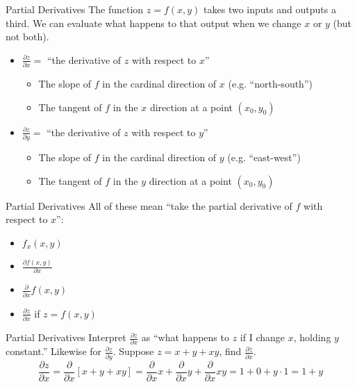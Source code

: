 \documentclass[aspectratio=169]{beamer}
\begin{document}
\begin{frame}{Partial Derivatives}\label{main1}
    The function $z = f(x, y)$ takes two inputs and outputs a third.  We can evaluate what happens to that output when we change $x$ or $y$ (but not both).
    \begin{itemize}
        \item $\frac{\partial z}{\partial x} =$ “the derivative of $z$ with respect to $x$”
        \begin{itemize}
        \item The slope of $f$ in the cardinal direction of $x$ (e.g. “north-south”)
        \item The tangent of $f$ in the $x$ direction at a point $(x_0, y_0)$
        \end{itemize}
        \item $\frac{\partial z}{\partial y} =$ “the derivative of $z$ with respect to $y$”
        \begin{itemize}
        \item The slope of $f$ in the cardinal direction of $y$ (e.g. “east-west”)
        \item The tangent of $f$ in the $y$ direction at a point $(x_0, y_0)$
    	\end{itemize}
    \end{itemize}
\end{frame}

\begin{frame}{Partial Derivatives}\label{main1}
    All of these mean “take the partial derivative of $f$ with respect to $x$”:
    \begin{itemize}
        \item $f_x(x, y)$
        \item $\frac{\partial f(x, y)}{\partial x}$
        \item $\frac{\partial}{\partial x} f(x, y)$
        \item $\frac{\partial z}{\partial x}$ if $z = f(x, y)$
    \end{itemize}
\end{frame}

\begin{frame}{Partial Derivatives}\label{main1}
    Interpret $\frac{\partial z}{\partial x}$ as “what happens to $z$ if I change $x$, holding $y$ constant.” Likewise for $\frac{\partial z}{\partial y}$.
 	Suppose $z = x + y + xy$, find $\frac{\partial z}{\partial x}$.
    \[
    \frac{\partial z}{\partial x} = \frac{\partial}{\partial x} [x + y + xy] = \frac{\partial}{\partial x} x + \frac{\partial}{\partial x} y + \frac{\partial}{\partial x} xy = 1 + 0 + y \cdot 1 = 1 + y
    \]
\end{frame}
\end{document}

